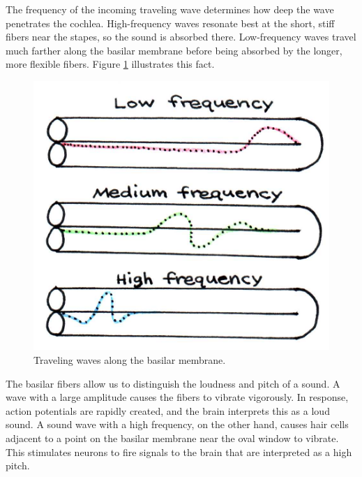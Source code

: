 The frequency of the incoming traveling wave determines how deep the wave penetrates the cochlea.  High-frequency waves resonate best at the short, stiff fibers near the stapes, so the sound is absorbed there.  Low-frequency waves travel much farther along the basilar membrane before being absorbed by the longer, more flexible fibers.  Figure \ref{Fig3-11} illustrates this fact.  
\begin{figure}[htb]
	\centering
 	\includegraphics[width=4.5in]{./figures/Topic3/Fig3-11.jpg}
 	\caption{Traveling waves along the basilar membrane.}
	\label{Fig3-11}
\end{figure}
 
The basilar fibers allow us to distinguish the loudness and pitch of a sound.  A wave with a large amplitude causes the fibers to vibrate vigorously.  In response, action potentials are rapidly created, and the brain interprets this as a loud sound.  A sound wave with a high frequency, on the other hand, causes hair cells adjacent to a point on the basilar membrane near the oval window to vibrate.  This stimulates neurons to fire signals to the brain that are interpreted as a high pitch.